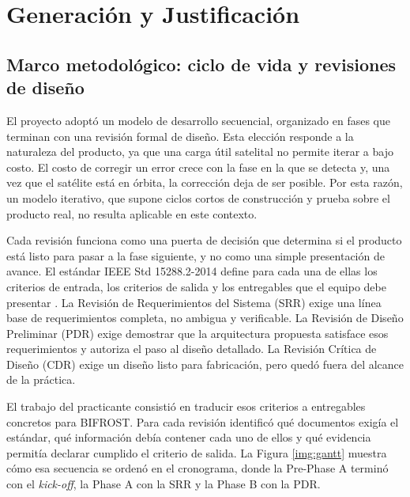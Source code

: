 \section{Generación y Justificación}

\subsection{Marco metodológico: ciclo de vida y revisiones de diseño}

El proyecto adoptó un modelo de desarrollo secuencial, organizado en fases que terminan con una revisión formal de diseño. Esta elección responde a la naturaleza del producto, ya que una carga útil satelital no permite iterar a bajo costo. El costo de corregir un error crece con la fase en la que se detecta y, una vez que el satélite está en órbita, la corrección deja de ser posible. Por esta razón, un modelo iterativo, que supone ciclos cortos de construcción y prueba sobre el producto real, no resulta aplicable en este contexto.

Cada revisión funciona como una puerta de decisión que determina si el producto está listo para pasar a la fase siguiente, y no como una simple presentación de avance. El estándar IEEE Std 15288.2-2014 define para cada una de ellas los criterios de entrada, los criterios de salida y los entregables que el equipo debe presentar \parencite{ieee15288-2}. La Revisión de Requerimientos del Sistema (SRR) exige una línea base de requerimientos completa, no ambigua y verificable. La Revisión de Diseño Preliminar (PDR) exige demostrar que la arquitectura propuesta satisface esos requerimientos y autoriza el paso al diseño detallado. La Revisión Crítica de Diseño (CDR) exige un diseño listo para fabricación, pero quedó fuera del alcance de la práctica.

El trabajo del practicante consistió en traducir esos criterios a entregables concretos para BIFROST. Para cada revisión identificó qué documentos exigía el estándar, qué información debía contener cada uno de ellos y qué evidencia permitía declarar cumplido el criterio de salida. La Figura \ref{img:gantt} muestra cómo esa secuencia se ordenó en el cronograma, donde la Pre-Phase A terminó con el \textit{kick-off}, la Phase A con la SRR y la Phase B con la PDR.


